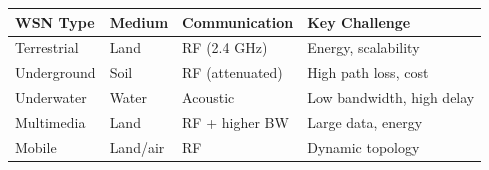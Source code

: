 \documentclass[12pt,a4paper]{article}
\renewcommand{\arraystretch}{1.45}
\begin{document}
\begin{tcolorbox}[tikzbox, title={\textbf{Summary: WSN Types Comparison Table}}]
\par\noindent
{\renewcommand{\arraystretch}{1.4}%
\begin{tabularx}{\linewidth}{|B{2.6cm}|Y|Y|Y|}
\hline
\textbf{WSN Type} & \textbf{Medium} & \textbf{Communication} & \textbf{Key Challenge} \\
\hline
Terrestrial & Land & RF (2.4 GHz) & Energy, scalability \\
\hline
Underground & Soil & RF (attenuated) & High path loss, cost \\
\hline
Underwater & Water & Acoustic & Low bandwidth, high delay \\
\hline
Multimedia & Land & RF + higher BW & Large data, energy \\
\hline
Mobile & Land/air & RF & Dynamic topology \\
\hline
\end{tabularx}}
\end{tcolorbox}
\end{document}
